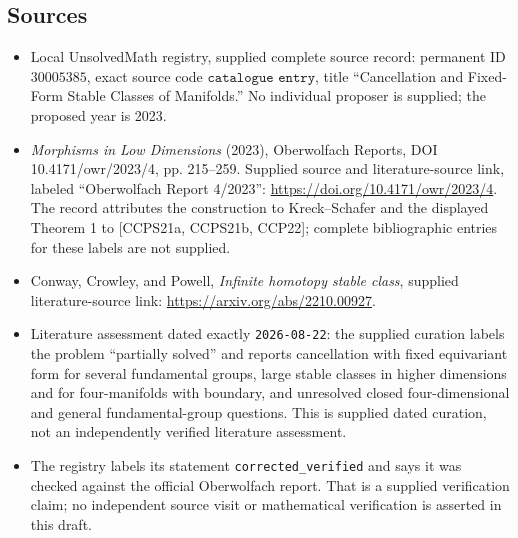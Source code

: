 \documentclass[11pt]{article}
\begin{document}
\subsection{Sources}
\begin{itemize}
\item Local UnsolvedMath registry, supplied complete source record: permanent ID \(30005385\), exact source code \(\texttt{catalogue entry}\), title ``Cancellation and Fixed-Form Stable Classes of Manifolds.'' No individual proposer is supplied; the proposed year is 2023.
\item \emph{Morphisms in Low Dimensions} (2023), Oberwolfach Reports, DOI 10.4171/owr/2023/4, pp. 215--259. Supplied source and literature-source link, labeled ``Oberwolfach Report 4/2023'': \url{https://doi.org/10.4171/owr/2023/4}. The record attributes the construction to Kreck--Schafer and the displayed Theorem 1 to [CCPS21a, CCPS21b, CCP22]; complete bibliographic entries for these labels are not supplied.
\item Conway, Crowley, and Powell, \emph{Infinite homotopy stable class}, supplied literature-source link: \url{https://arxiv.org/abs/2210.00927}.
\item Literature assessment dated exactly \texttt{2026-08-22}: the supplied curation labels the problem ``partially solved'' and reports cancellation with fixed equivariant form for several fundamental groups, large stable classes in higher dimensions and for four-manifolds with boundary, and unresolved closed four-dimensional and general fundamental-group questions. This is supplied dated curation, not an independently verified literature assessment.
\item The registry labels its statement \texttt{corrected\_verified} and says it was checked against the official Oberwolfach report. That is a supplied verification claim; no independent source visit or mathematical verification is asserted in this draft.
\end{itemize}
\end{document}
